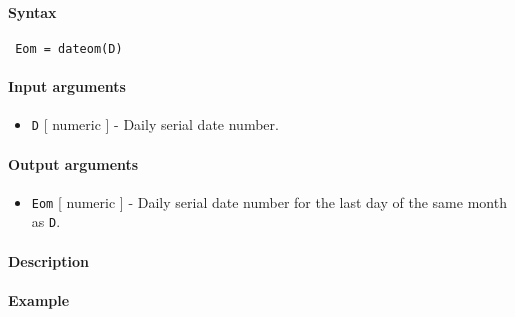 


	\paragraph{Syntax}
 
 \begin{verbatim}
 Eom = dateom(D)
 \end{verbatim}
 
 \paragraph{Input arguments}
 
 \begin{itemize}
 \item
   \texttt{D} {[} numeric {]} - Daily serial date number.
 \end{itemize}
 
 \paragraph{Output arguments}
 
 \begin{itemize}
 \item
   \texttt{Eom} {[} numeric {]} - Daily serial date number for the last
   day of the same month as \texttt{D}.
 \end{itemize}
 
 \paragraph{Description}
 
 \paragraph{Example}


